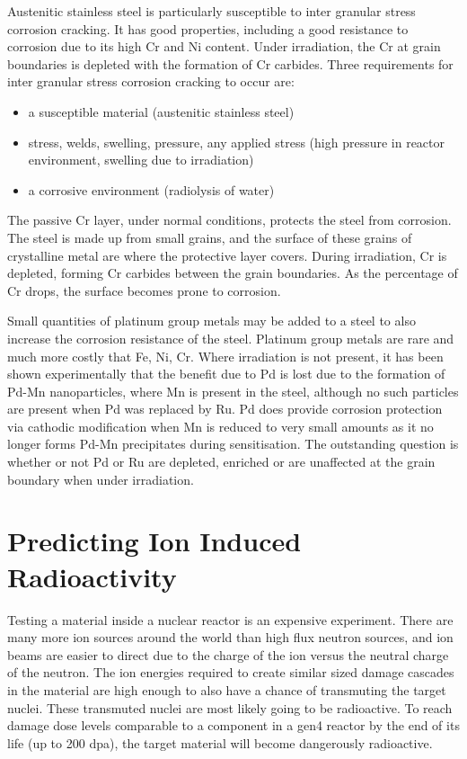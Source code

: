 Austenitic stainless steel is particularly susceptible to inter granular stress corrosion cracking.  It has good properties, including a good resistance to corrosion due to its high Cr and Ni content.  Under irradiation, the Cr at grain boundaries is depleted with the formation of Cr carbides.  Three requirements for inter granular stress corrosion cracking to occur are:

\begin{itemize}
\item a susceptible material (austenitic stainless steel)
\item stress, welds, swelling, pressure, any applied stress (high pressure in reactor environment, swelling due to irradiation)
\item a corrosive environment (radiolysis of water)
\end{itemize}

The passive Cr layer, under normal conditions, protects the steel from corrosion.  The steel is made up from small grains, and the surface of these grains of crystalline metal are where the protective layer covers.  During irradiation, Cr is depleted, forming Cr carbides between the grain boundaries.  As the percentage of Cr drops, the surface becomes prone to corrosion.

Small quantities of platinum group metals may be added to a steel to also increase the corrosion resistance of the steel.  Platinum group metals are rare and much more costly that Fe, Ni, Cr.  Where irradiation is not present, it has been shown experimentally that the benefit due to Pd is lost due to the formation of Pd-Mn nanoparticles, where Mn is present in the steel, although no such particles are present when Pd was replaced by Ru.  Pd does provide corrosion protection via cathodic modification when Mn is reduced to very small amounts as it no longer forms Pd-Mn precipitates during sensitisation.  The outstanding question is whether or not Pd or Ru are depleted, enriched or are unaffected at the grain boundary when under irradiation.




\section{Predicting Ion Induced Radioactivity}

Testing a material inside a nuclear reactor is an expensive experiment.  There are many more ion sources around the world than high flux neutron sources, and ion beams are easier to direct due to the charge of the ion versus the neutral charge of the neutron.  The ion energies required to create similar sized damage cascades in the material are high enough to also have a chance of transmuting the target nuclei.  These transmuted nuclei are most likely going to be radioactive.  To reach damage dose levels comparable to a component in a \acrshort{gen4} reactor by the end of its life (up to 200 \acrshort{dpa}), the target material will become dangerously radioactive. 

